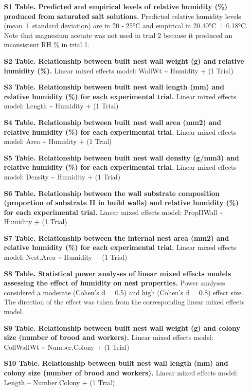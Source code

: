 \documentclass[3p]{elsarticle} %
\begin{document}
\textbf{S1 Table. Predicted and empirical levels of relative humidity
(\%) produced from saturated salt solutions.} Predicted relative
humidity levels (mean ± standard deviation) are in 20 - 25°C and
empirical in 20.40°C ± 0.18°C. Note that magnesium acetate was not used
in trial 2 because it produced an inconsistent RH \% in trial 1.

\textbf{S2 Table. Relationship between built nest wall weight (g) and
relative humidity (\%).} Linear mixed effects model: WallWt
\textasciitilde{} Humidity + (1 \textbar{} Trial)

\textbf{S3 Table. Relationship between built nest wall length (mm) and
relative humidity (\%) for each experimental trial.} Linear mixed
effects model: Length \textasciitilde{} Humidity + (1 \textbar{} Trial)

\textbf{S4 Table. Relationship between built nest wall area (mm2) and
relative humidity (\%) for each experimental trial.} Linear mixed
effects model: Area \textasciitilde{} Humidity + (1 \textbar{} Trial)

\textbf{S5 Table. Relationship between built nest wall density (g/mm3)
and relative humidity (\%) for each experimental trial.} Linear mixed
effects model: Density \textasciitilde{} Humidity + (1 \textbar{} Trial)

\textbf{S6 Table. Relationship between the wall substrate composition
(proportion of substrate II in build walls) and relative humidity (\%)
for each experimental trial.} Linear mixed effects model: PropIIWall
\textasciitilde{} Humidity + (1 \textbar{} Trial)

\textbf{S7 Table. Relationship between the internal nest area (mm2) and
relative humidity (\%) for each experimental trial.} Linear mixed
effects model: Nest.Area \textasciitilde{} Humidity + (1 \textbar{}
Trial)

\textbf{S8 Table. Statistical power analyses of linear mixed effects
models assessing the effect of humidity on nest properties.} Power
analyses considered a moderate (Cohen's d = 0.5) and high (Cohen's d =
0.8) effect size. The direction of the effect was taken from the
corresponding linear mixed effects model.

\textbf{S9 Table. Relationship between built nest wall weight (g) and
colony size (number of brood and workers).} Linear mixed effects model:
CollWallWt \textasciitilde{} Number.Colony + (1 \textbar{} Trial)

\textbf{S10 Table. Relationship between built nest wall length (mm) and
colony size (number of brood and workers).} Linear mixed effects model:
Length \textasciitilde{} Number.Colony + (1 \textbar{} Trial)
\end{document}
